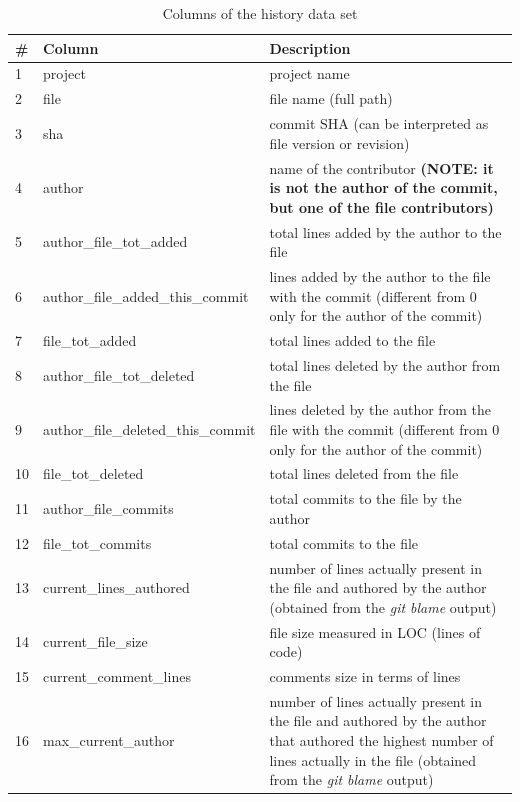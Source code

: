 \begin{table}[ht]
\centering
\caption{Columns of the history data set}
\label{tab:history}
\footnotesize
\begin{tabular}{|l|l|p{}|}
\hline
\# & \textbf{Column} & \textbf{Description}  \\
\hline
1 & project & 
    project name \\ \hline
2 & file & 
    file name (full path)\\ \hline
3 & sha & 
    commit SHA (can be interpreted as file version or revision) \\ \hline
4 & author & 
    name of the contributor \textbf{(NOTE: it is not the author of the commit, but one of the file contributors)} \\ \hline
5 & author\_file\_tot\_added & 
    total lines added by the author to the file\\ \hline
6 & author\_file\_added\_this\_commit & 
    lines added by the author to the file with the commit (different from 0 only for the author of the commit)\\ \hline
7 & file\_tot\_added & 
    total lines added to the file\\ \hline
8 & author\_file\_tot\_deleted & 
    total lines deleted by the author from the file\\ \hline
9 & author\_file\_deleted\_this\_commit & 
    lines deleted by the author from the file with the commit (different from 0 only for the author of the commit)\\ \hline
10 & file\_tot\_deleted & 
    total lines deleted from the file\\ \hline
11 & author\_file\_commits & 
    total commits to the file by the author\\ \hline
12 & file\_tot\_commits & 
    total commits to the file\\ \hline
13 & current\_lines\_authored & 
    number of lines actually present in the file and authored by the author (obtained from the \textit{git blame} output)\\\hline
14 & current\_file\_size & 
    file size measured in LOC (lines of code)\\\hline
15 & current\_comment\_lines & 
    comments size in terms of lines\\\hline
16 & max\_current\_author & 
    number of lines actually present in the file and authored by the author that authored the highest number of lines actually in the file (obtained from the \textit{git blame} output)\\\hline

\end{tabular}
\end{table}
